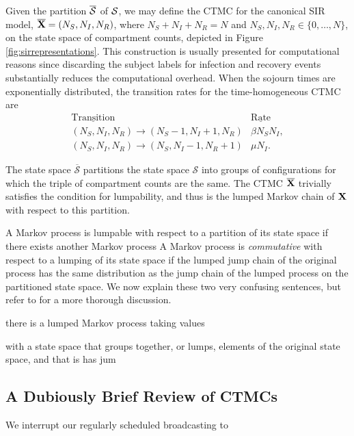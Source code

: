 Given the partition $ \overline{\mathcal{S}} $ of $ \mathcal{S} $, we may define the CTMC for the canonical SIR model, $ \overline{\mathbf{X}} = (N_S, N_I, N_R) $, where $ N_S + N_I + N_R = N $ and $ N_S,N_I,N_R \in \lbrace0,\dots,N\rbrace $, on the state space of compartment counts, depicted in Figure \ref{fig:sirrepresentations}. This construction is usually presented for computational reasons since discarding the subject labels for infection and recovery events substantially reduces the computational overhead. When the sojourn times are exponentially distributed, the transition rates for the time-homogeneous CTMC are 
\begin{equation*}
\begin{array}{cc}
\underline{\text{Transition}} & \underline{\text{Rate}} \\
(N_S,N_I,N_R) \longrightarrow (N_S-1,N_I+1,N_R) & \beta N_S N_I ,\\
(N_S,N_I,N_R) \longrightarrow (N_S,N_I-1,N_R+1) & \mu N_I .
\end{array}
\end{equation*}

The state space $ \overline{\mathcal{S}} $ partitions the state space $ \mathcal{S} $ into groups of configurations for which the triple of compartment counts are the same. The CTMC $\overline{\mathbf{X}}$ trivially satisfies the condition for lumpability, and thus is the lumped Markov chain of $ \mathbf{X} $ with respect to this partition.

A Markov process is lumpable with respect to a partition of its state space if there exists another Markov process  A Markov process is \textit{commutative} with respect to a lumping of its state space if the lumped jump chain of the original process has the same distribution as the jump chain of the lumped process on the partitioned state space. We now explain these two very confusing sentences, but refer to \cite{tian2006lumpability} for a more thorough discussion. 

 

there is a lumped Markov process taking values 

with a state space that groups together, or lumps, elements of the original state space, and that is has jum

\subsection{A Dubiously Brief Review of CTMCs}
\label{subsec:ctmc_overview}
We interrupt our regularly scheduled broadcasting to 


